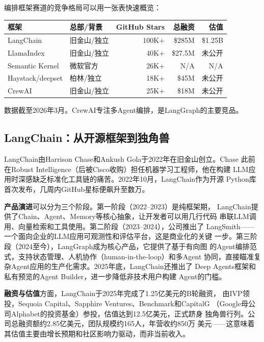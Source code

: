 编排框架赛道的竞争格局可以用一张表快速概览：

\begin{keybox}[LLM编排框架赛道核心数据]
\small
\begin{tabularx}{\textwidth}{l l r r r}
\toprule
\rowcolor{figLightGray}
\textbf{框架} & \textbf{总部/背景} & \textbf{GitHub Stars} & \textbf{总融资} & \textbf{估值} \\
\midrule
LangChain       & 旧金山/独立  & 100K+  & \$285M  & \$1.25B \\
LlamaIndex      & 旧金山/独立  & 40K+   & \$27.5M & 未公开 \\
Semantic Kernel  & 微软官方     & 26K+   & N/A     & N/A \\
Haystack/deepset & 柏林/独立   & 18K+   & \$45M   & 未公开 \\
CrewAI          & 旧金山/独立  & 25K+   & \$18M   & 未公开 \\
\bottomrule
\end{tabularx}

\medskip
\noindent 数据截至2026年3月。CrewAI专注多Agent编排，是LangGraph的主要竞品。
\end{keybox}

\subsection{LangChain：从开源框架到独角兽}
\label{subsec:langchain}

LangChain由Harrison Chase和Ankush Gola于2022年在旧金山创立。Chase
此前在Robust Intelligence（后被Cisco收购）担任机器学习工程师，他在构建
LLM应用时深感缺乏标准化工具链的痛苦。2022年10月，LangChain作为开源
Python库首次发布，几周内GitHub星标便飙升至数万。

\textbf{产品演进}可以分为三个阶段。第一阶段（2022--2023）是纯框架期，
LangChain提供了Chain、Agent、Memory等核心抽象，让开发者可以用几行代码
串联LLM调用、向量检索和工具使用。第二阶段（2023--2024），公司推出了
LangSmith——一个面向企业的LLM应用可观测性和评估平台，这是商业化的关键
一步。第三阶段（2024至今），LangGraph成为核心产品，它提供了基于有向图
的Agent编排范式，支持状态管理、人机协作（human-in-the-loop）和多Agent
协同，直接瞄准复杂Agent应用的生产化需求。2025年底，LangChain还推出了
Deep Agents框架和私有预览的Agent Builder，进一步降低非技术用户构建
Agent的门槛。

\textbf{融资与估值}方面，LangChain于2025年完成了1.25亿美元的B轮融资，
由IVP领投，Sequoia Capital、Sapphire Ventures、Benchmark和CapitalG
（Google母公司Alphabet的投资基金）参投，估值达到12.5亿美元，正式跻身
独角兽行列。公司总融资额约2.85亿美元，团队规模约165人，年营收约850万
美元——这意味着其估值主要由增长预期和社区影响力驱动，而非当前收入。

